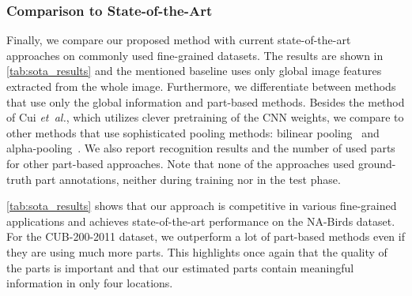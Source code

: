 \documentclass[runningheads]{llncs}
\newcommand{\etal}{\emph{et~al.}}
\begin{document}
\vspace{-.5\baselineskip}
\subsubsection{Comparison to State-of-the-Art}

Finally, we compare our proposed method with current state-of-the-art approaches on commonly used fine-grained datasets.
The results are shown in \autoref{tab:sota_results} and the mentioned baseline uses only global image features extracted from the whole image.
Furthermore, we differentiate between methods that use only the global information and part-based methods.
Besides the method of Cui \etal, which utilizes clever pretraining of the CNN weights, we compare to other methods that use sophisticated pooling methods: bilinear pooling~\cite{lin2015bilinear} and alpha-pooling~\cite{Simon19:Implicit}.
We also report recognition results and the number of used parts for other part-based approaches.
Note that none of the approaches used ground-truth part annotations, neither during training nor in the test phase.

\autoref{tab:sota_results} shows that our approach is competitive in various fine-grained applications and achieves state-of-the-art performance on the NA-Birds dataset.
For the CUB-200-2011 dataset, we outperform a lot of part-based methods even if they are using much more parts.
This highlights once again that the quality of the parts is important and that our estimated parts contain meaningful information in only four locations.
\end{document}
